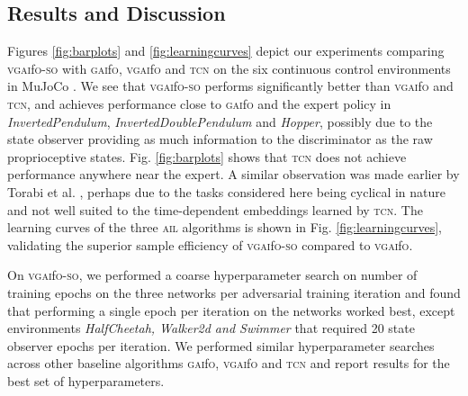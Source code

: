 \documentclass[letterpaper, 10 pt, conference]{ieeeconf}  %
\newcommand{\gaifo}{\textsc{gai}f\textsc{o}}
\newcommand{\vgaifo}{\textsc{vgai}f\textsc{o}}
\newcommand{\vgaifoso}{\textsc{vgai}f\textsc{o}-\textsc{so}}
\newcommand{\tcn}{\textsc{tcn}}
\newcommand{\ail}{\textsc{ail}}
\begin{document}

\subsection{Results and Discussion}

Figures \ref{fig:barplots} and \ref{fig:learningcurves} depict our experiments comparing \vgaifoso{} with \gaifo{}, \vgaifo{} and \tcn{} on the six continuous control environments in MuJoCo \cite{mujoco, openai}. We see that \vgaifoso{} performs significantly better than \vgaifo{} and \tcn{}, and achieves performance close to \gaifo{} and the expert policy in \textit{InvertedPendulum}, \textit{InvertedDoublePendulum} and \textit{Hopper}, possibly due to the state observer providing as much information to the discriminator as the raw proprioceptive states. Fig. \ref{fig:barplots} shows that \tcn{} does not achieve performance anywhere near the expert. A similar observation was made earlier by Torabi et al. \cite{gaifo_proprio}, perhaps due to the tasks considered here being cyclical in nature and not well suited to the time-dependent embeddings learned by \tcn{}. The learning curves of the three \ail{} algorithms is shown in Fig. \ref{fig:learningcurves}, validating the superior sample efficiency of \vgaifoso{} compared to \vgaifo{}.

On \vgaifoso{}, we performed a coarse hyperparameter search on number of training epochs on the three networks per adversarial training iteration and found that performing a single epoch per iteration on the networks worked best, except environments \textit{HalfCheetah, Walker2d and Swimmer} that required 20 state observer epochs per iteration. We performed similar hyperparameter searches across other baseline algorithms \gaifo{}, \vgaifo{} and \tcn{} and report results for the best set of hyperparameters. 
\end{document}
